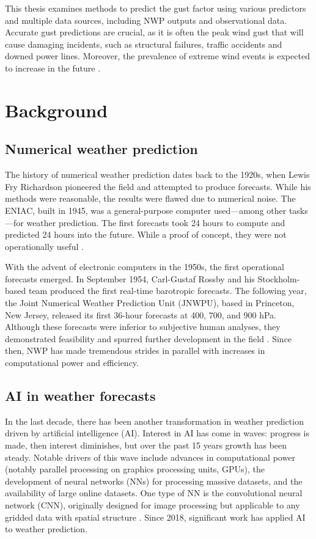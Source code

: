This thesis examines methods to predict the gust factor using various predictors and multiple data sources, including NWP outputs and observational data. Accurate gust predictions are crucial, as it is often the peak wind gust that will cause damaging incidents, such as structural failures, traffic accidents and downed power lines. Moreover, the prevalence of extreme wind events is expected to increase in the future \parencite{nasa_extreme_weather}.

\section{Background}

\subsection{Numerical weather prediction}
The history of numerical weather prediction dates back to the 1920s, when Lewis Fry Richardson pioneered the field and attempted to produce forecasts. While his methods were reasonable, the results were flawed due to numerical noise. The ENIAC, built in 1945, was a general-purpose computer used—among other tasks—for weather prediction. The first forecasts took 24 hours to compute and predicted 24 hours into the future. While a proof of concept, they were not operationally useful \parencite{TheENIACForecastsARecreation}. 

With the advent of electronic computers in the 1950s, the first operational forecasts emerged. In September 1954, Carl-Gustaf Rossby and his Stockholm-based team produced the first real-time barotropic forecasts. The following year, the Joint Numerical Weather Prediction Unit (JNWPU), based in Princeton, New Jersey, released its first 36-hour forecasts at 400, 700, and 900 hPa. Although these forecasts were inferior to subjective human analyses, they demonstrated feasibility and spurred further development in the field \parencite{historyNWP}. Since then, NWP has made tremendous strides in parallel with increases in computational power and efficiency.

\subsection{AI in weather forecasts}
In the last decade, there has been another transformation in weather prediction driven by artificial intelligence (AI). Interest in AI has come in waves: progress is made, then interest diminishes, but over the past 15 years growth has been steady. Notable drivers of this wave include advances in computational power (notably parallel processing on graphics processing units, GPUs), the development of neural networks (NNs) for processing massive datasets, and the availability of large online datasets. One type of NN is the convolutional neural network (CNN), originally designed for image processing but applicable to any gridded data with spatial structure \parencite{canNNBeatNWP}. Since 2018, significant work has applied AI to weather prediction.

